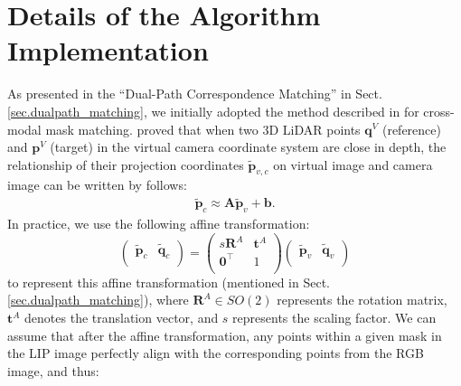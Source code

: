 \clearpage
\setcounter{page}{1}

{
   \newpage
}

\section{Details of the Algorithm Implementation}
\label{sec.sup_algo_detail}
As presented in the ``Dual-Path Correspondence Matching'' in Sect. \ref{sec.dualpath_matching}, we initially adopted the method described in \cite{zhiwei2024lcec} for cross-modal mask matching. \cite{zhiwei2024lcec} proved that when two 3D LiDAR points $\boldsymbol{q}^V$ (reference) and $\boldsymbol{p}^V$ (target) in the virtual camera coordinate system are close in depth, the relationship of their projection coordinates $\tilde{\boldsymbol{p}}_{v,c}$ on virtual image and camera image can be written by follows:
\begin{align}
\tilde{\boldsymbol{p}}_c \approx 
\boldsymbol{A}
\tilde{\boldsymbol{p}}_v + 
\boldsymbol{b}.
\label{eq.LscLaw}
\end{align}
In practice, we use the following affine transformation:
\begin{equation}
\begin{pmatrix}
\tilde{\boldsymbol{p}}_c & \tilde{\boldsymbol{q}}_c \\
\end{pmatrix}
=
\begin{pmatrix}
s{\boldsymbol{R}}^A & \boldsymbol{t}^A \\
\boldsymbol{0}^\top &1 \\
\end{pmatrix}
\begin{pmatrix}
\tilde{\boldsymbol{p}}_v & \tilde{\boldsymbol{q}}_v \\
\end{pmatrix}
\label{eq.LscLaw_final}
\end{equation}
to represent this affine transformation (mentioned in Sect. \ref{sec.dualpath_matching}), where $\boldsymbol{R}^A\in{SO(2)}$ represents the rotation matrix, $\boldsymbol{t}^A$ denotes the translation vector, and $s$ represents the scaling factor. We can assume that after the affine transformation, any points within a given mask in the LIP image perfectly align with the corresponding points from the RGB image, and thus:
